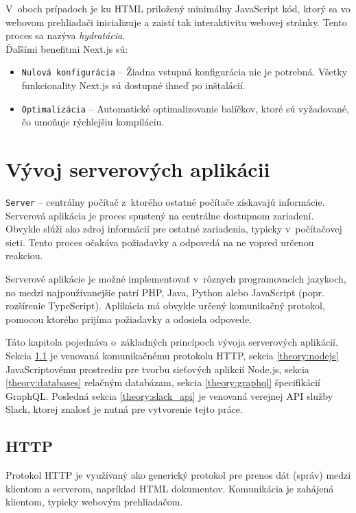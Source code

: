 \noindent V~oboch prípadoch je ku HTML priložený minimálny JavaScript kód, ktorý sa vo webovom prehliadači inicializuje a zaistí tak interaktivitu webovej stránky. Tento proces sa nazýva \emph{hydratácia}. \cite{NextJS} \\

\noindent Ďaľšími benefitmi Next.js sú:
\begin{itemize}
	\item \texttt{Nulová konfigurácia} -- Žiadna vstupná konfigurácia nie je potrebná. Všetky funkcionality Next.js sú dostupné ihneď po inštalácií. \cite{NextJS}
	\item \texttt{Optimalizácia} -- Automatické optimalizovanie balíčkov, ktoré sú vyžadované, čo umoňuje rýchlejšiu kompiláciu. \cite{NextJS}
\end{itemize}

\chapter{Vývoj serverových aplikácii}
\label{theory:server_dev}
\texttt{Server} -- centrálny počítač z~ktorého ostatné počítače získavajú informácie. \cite{CamDict} \\

\noindent Serverová aplikácia je proces spustený na centrálne dostupnom zariadení. Obvykle slúži ako zdroj informácií pre ostatné zariadenia, typicky v~počítačovej sieti. Tento proces očakáva požiadavky a odpovedá na ne vopred určenou reakciou.

Serverové aplikácie je možné implementovať v~rôznych programovacích jazykoch, no medzi najpoužívanejšie patrí PHP, Java, Python alebo JavaScript (popr. rozšírenie TypeScript). Aplikácia má obvykle určený komunikačný protokol, pomocou ktorého prijíma požiadavky a odosiela odpovede.

Táto kapitola pojednáva o~základných princípoch vývoja serverových aplikácií. Sekcia \ref{theory:HTTP} je venovaná komunikačnému protokolu HTTP, sekcia \ref{theory:nodejs} JavaScriptovému prostrediu pre tvorbu sieťových aplikcií Node.js, sekcia \ref{theory:databases} relačným databázam, sekcia \ref{theory:graphql} špecifikácií GraphQL. Posledná sekcia \ref{theory:slack_api} je venovaná verejnej API služby Slack, ktorej znalosť je nutná pre vytvorenie tejto práce.

\section{HTTP}
\label{theory:HTTP}
Protokol HTTP je využívaný ako generický protokol pre prenos dát (správ) medzi klientom a serverom, napríklad HTML dokumentov. Komunikácia je zahájená klientom, typicky webovým prehliadačom.

